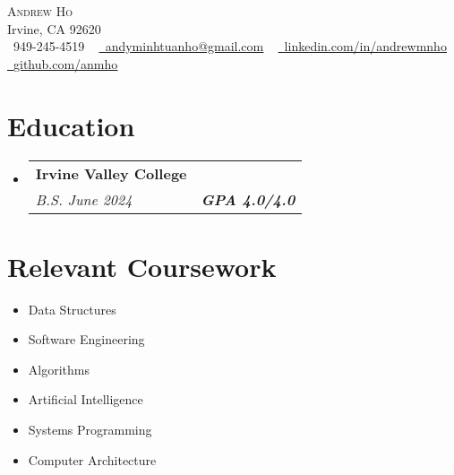 \documentclass[letterpaper,11pt]{article}
\makeatletter
\newcommand{\resumeSubheading}[4]{
  \vspace{-2pt}\item
    \begin{tabular*}{1.0\textwidth}[t]{l@{\extracolsep{\fill}}r}
      \textbf{#1} & \textbf{\small #2} \\
      \textit{\small#3} & \textit{\small #4} \\
    \end{tabular*}\vspace{-7pt}
}
\newcommand{\resumeSubHeadingListStart}{\begin{itemize}[leftmargin=0.0in, label={}]}
\newcommand{\resumeSubHeadingListEnd}{\end{itemize}}
\makeatother
\begin{document}

\begin{center}
    {\Huge \scshape Andrew Ho} \\ \vspace{1pt}
    Irvine, CA 92620 \\ \vspace{1pt}
    \small \raisebox{-0.1\height}\faPhone\ 949-245-4519 ~ \href{mailto:x@gmail.com}{\raisebox{-0.2\height}\faEnvelope\  \underline{andyminhtuanho@gmail.com}} ~
    \href{https://linkedin.com/in/andrewmnho/}{\raisebox{-0.2\height}\faLinkedin\ \underline{linkedin.com/in/andrewmnho}}  ~
    \href{https://github.com/}{\raisebox{-0.2\height}\faGithub\ \underline{github.com/anmho}}
    \vspace{-8pt}
\end{center}


\section{Education}
\resumeSubHeadingListStart
\resumeSubheading
{Irvine Valley College \normalfont{\small{-- Irvine, CA}}}{\normalfont{Computer Science}}
{B.S. June 2024}{\textbf{GPA 4.0/4.0}}
\resumeSubHeadingListEnd

\section{Relevant Coursework}
\begin{multicols}{4}
    \begin{itemize}[itemsep=-5pt, parsep=3pt]
        \item\small Data Structures
        \item Software Engineering
        \item Algorithms
        \item Artificial Intelligence
        \item Systems Programming
        \item Computer Architecture
    \end{itemize}
\end{multicols}
\vspace*{2.0\multicolsep}
\end{document}
